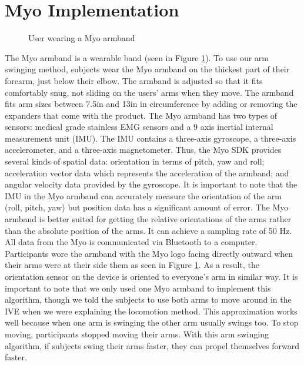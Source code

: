 \documentclass{vgtc}                          %
\begin{document}
\section{Myo Implementation}
\begin{figure}[h]
  \centering
  \def\svgwidth{.2\textwidth}
  
  \caption{User wearing a Myo armband}
  \label{fig:morgan}
\end{figure}
The Myo armband is a wearable band (seen in Figure \ref{fig:morgan}).
To use our arm swinging method, subjects wear the Myo armband on the thickest part of their forearm, just below their elbow.
The armband is adjusted so that it fits comfortably snug, not sliding on the users’ arms when they move.
The armband fits arm sizes between 7.5in and 13in in circumference
by adding or removing the expanders that come with the product.
The Myo armband has two types of sensors:
medical grade stainless EMG sensors
and a 9 axis inertial internal measurement unit (IMU).
The IMU contains a three-axis gyroscope, a three-axis accelerometer, and a three-axis magnetometer.
Thus, the Myo SDK provides several kinds of spatial data: orientation in terms of pitch, yaw and roll;
acceleration vector data which represents the acceleration of the armband;
and angular velocity data provided by the gyroscope.
It is important to note that the IMU in the Myo armband can accurately measure the orientation of the arm (roll, pitch, yaw)
but position data has a significant amount of error.
The Myo armband is better suited for getting the relative orientations of the arms rather than the
absolute position of the arms.
It can achieve a sampling rate of 50 Hz.
All data from the Myo is communicated via Bluetooth to a computer.
Participants wore the armband
with the Myo logo facing directly outward when their arms were
at their side them as seen in Figure \ref{fig:morgan}.
As a result, the orientation sensor on the device is oriented to everyone’s arm in similar way.
It is important to note that we only used one Myo armband to implement this algorithm,
though we told the subjects to use both arms to move around in the IVE
when we were explaining the locomotion method.
This approximation works well because when one arm is swinging the other arm usually swings too.
To stop moving, participants stopped moving their arms.
With this arm swinging algorithm, if subjects swing their arms faster, they can propel themselves forward faster.
\end{document}
